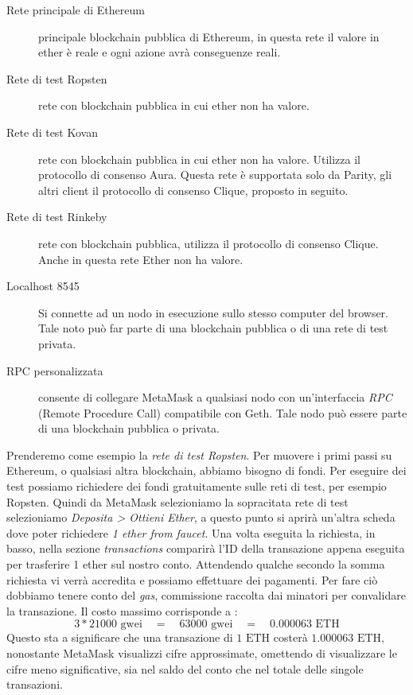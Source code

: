 \begin{description}
	\item [Rete principale di Ethereum] principale blockchain pubblica di Ethereum, in questa rete il valore in ether è reale e ogni azione avrà conseguenze reali.
	\item [Rete di test Ropsten] rete con blockchain pubblica in cui ether non ha valore.
	\item [Rete di test Kovan] rete con blockchain pubblica in cui ether non ha valore. Utilizza il protocollo di consenso Aura. Questa rete è supportata solo da Parity, gli altri client il protocollo di consenso Clique, proposto in seguito. 
	\item [Rete di test Rinkeby] rete con blockchain pubblica, utilizza il protocollo di consenso Clique. Anche in questa rete Ether non ha valore.
	\item [Localhost 8545] Si connette ad un nodo in esecuzione sullo stesso computer del browser. Tale noto può far parte di una blockchain pubblica o di una rete di test privata.
	\item [RPC personalizzata] consente di collegare MetaMask a qualsiasi nodo con un'interfaccia \textit{RPC} (Remote Procedure Call) compatibile con Geth. Tale nodo può essere parte di una blockchain pubblica o privata. 	
\end{description}
Prenderemo come esempio la \textit{rete di test Ropsten}.
Per muovere i primi passi su Ethereum, o qualsiasi altra blockchain, abbiamo bisogno di fondi. Per eseguire dei test possiamo richiedere dei fondi gratuitamente sulle reti di test, per esempio Ropsten. Quindi da MetaMask selezioniamo la sopracitata rete di test selezioniamo \textit{Deposita > Ottieni Ether}, a questo punto si aprirà un'altra scheda dove poter richiedere \textit{1 ether from faucet}. Una volta eseguita la richiesta, in basso, nella sezione \textit{transactions} comparirà l'ID della transazione appena eseguita per trasferire 1 ether sul nostro conto. Attendendo qualche secondo la somma richiesta vi verrà accredita e possiamo effettuare dei pagamenti. Per fare ciò dobbiamo tenere conto del \textit{gas}, commissione raccolta dai minatori per convalidare la transazione. Il costo massimo corrisponde a :
\[ 3*21000 \text{ gwei} \quad = \quad 63000 \text{ gwei} \quad = \quad 0.000063 \text{ ETH}\]
Questo sta a significare che una transazione di $ 1 \text{ ETH} $ costerà $ 1.000063 \text{ ETH} $, nonostante MetaMask visualizzi cifre approssimate, omettendo di visualizzare le cifre meno significative, sia nel saldo del conto che nel totale delle singole transazioni.

